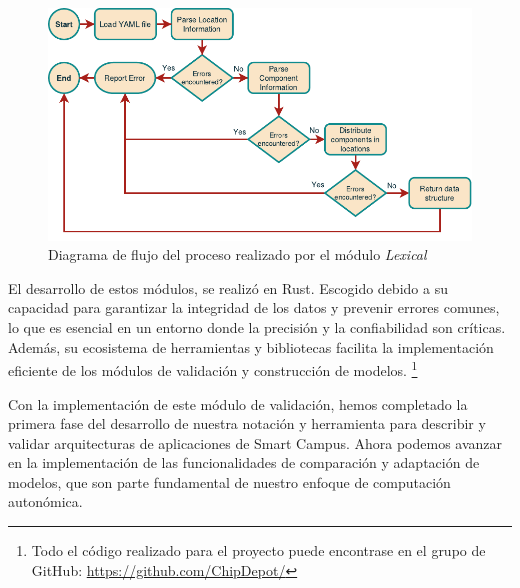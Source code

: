 \begin{figure}[H]
    \centering
    \caption{Diagrama de flujo del proceso realizado por el módulo \textit{Lexical}}
    \label{fig:LexicalFlow}
    \vspace{2mm}
    \includegraphics[width=\linewidth]{images/LexicalFlow.pdf}
\end{figure}

El desarrollo de estos módulos, se realizó en Rust. Escogido debido a su capacidad para garantizar la integridad de los datos y prevenir errores comunes, lo que es esencial en un entorno donde la precisión y la confiabilidad son críticas. Además, su ecosistema de herramientas y bibliotecas facilita la implementación eficiente de los módulos de validación y construcción de modelos. \footnote{Todo el código realizado para el proyecto puede encontrase en el grupo de GitHub: \url{https://github.com/ChipDepot/}}

Con la implementación de este módulo de validación, hemos completado la primera fase del desarrollo de nuestra notación y herramienta para describir y validar arquitecturas de aplicaciones de Smart Campus. Ahora podemos avanzar en la implementación de las funcionalidades de comparación y adaptación de modelos, que son parte fundamental de nuestro enfoque de computación autonómica. 


